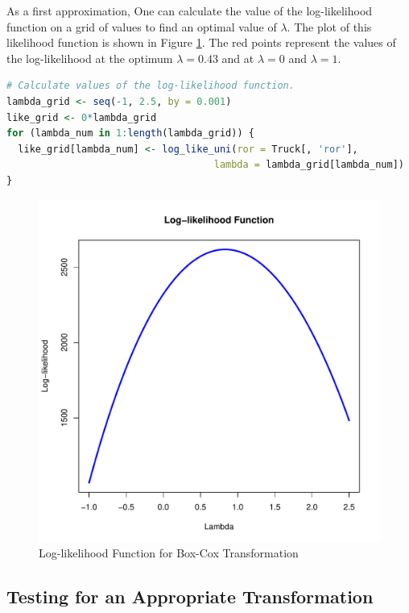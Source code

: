 \documentclass[11pt]{paper}
\begin{document}
\pagebreak

As a first approximation, 
One can calculate the value of the log-likelihood function on a grid of values
to find an optimal value of $\lambda$.
The plot of this likelihood function is shown in Figure \ref{fig:box_cox_loglike_uni}.
The red points represent the values of the log-likelihood 
at the optimum $\lambda = 0.43$ and at $\lambda = 0$ and $\lambda = 1$.

\begin{lstlisting}[language=R]
# Calculate values of the log-likelihood function.
lambda_grid <- seq(-1, 2.5, by = 0.001)
like_grid <- 0*lambda_grid
for (lambda_num in 1:length(lambda_grid)) {
  like_grid[lambda_num] <- log_like_uni(ror = Truck[, 'ror'],
                                    lambda = lambda_grid[lambda_num])
}
\end{lstlisting}

\begin{figure}[h!]
  \centering
  \includegraphics[scale = 0.5, keepaspectratio=true]{../Figures/box_cox_loglike_uni}
  \caption{Log-likelihood Function for Box-Cox Transformation} \label{fig:box_cox_loglike_uni}
\end{figure}


\pagebreak
\pagebreak
\subsection{Testing for an Appropriate Transformation}
\end{document}
